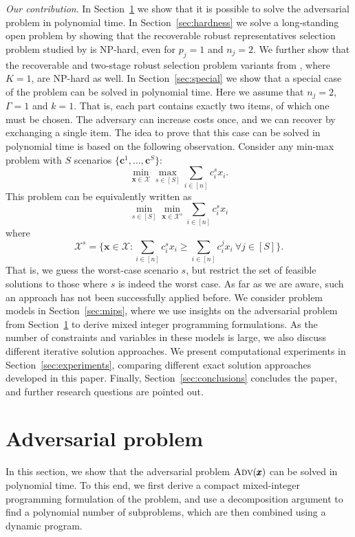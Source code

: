 \documentclass[a4paper,11pt,abstracton]{scrartcl}
\theoremstyle{definition}
\theoremstyle{remark}
\newcommand{\X}{\mathcal{X}}
\begin{document}
\emph{Our contribution}. In Section~\ref{sec:adv} we show that it is possible to solve the adversarial problem in polynomial time. In Section~\ref{sec:hardness} we solve a long-standing open problem by showing that the recoverable robust representatives selection problem studied by \cite{busing2011phd} is NP-hard, even for $p_j=1$ and $n_j=2$. We further show that the recoverable and two-stage robust selection problem variants from \cite{chassein2018recoverable}, where $K=1$, are NP-hard as well. In Section~\ref{sec:special} we show that a special case of the problem can be solved in polynomial time. Here we assume that $n_j=2$, $\Gamma=1$ and $k=1$. That is, each part contains exactly two items, of which one must be chosen. The adversary can increase costs once, and we can recover by exchanging a single item. The idea to prove that this case can be solved in polynomial time is based on the following observation. Consider any min-max problem with $S$ scenarios $\{\pmb{c}^1,\ldots,\pmb{c}^S\}$:
\[ \min_{\pmb{x}\in\X} \max_{s\in[S]} \sum_{i\in[n]} c^s_i x_i.\]
This problem can be equivalently written as
\[ \min_{s\in[S]} \min_{\pmb{x}\in\X^s} \sum_{i\in[n]} c^s_i x_i \]
where
\[ \X^s = \{ \pmb{x}\in\X : \sum_{i\in[n]} c^s_i x_i \ge \sum_{i\in[n]} c^{j}_i x_i\ \forall j\in[S] \}. \]
That is, we guess the worst-case scenario $s$, but restrict the set of feasible solutions to those where $s$ is indeed the worst case. As far as we are aware, such an approach has not been successfully applied before. 
We consider problem models in Section~\ref{sec:mips}, where we use insights on the adversarial problem from Section~\ref{sec:adv} to derive mixed integer programming formulations. As the number of constraints and variables in these models is large, we also discuss different iterative solution approaches. 
We present computational experiments in Section~\ref{sec:experiments}, comparing different exact solution approaches developed in this paper. Finally, Section~\ref{sec:conclusions} concludes the paper, and further research questions are pointed out.



\section{Adversarial problem}
\label{sec:adv}

In this section, we show that the adversarial problem $\textsc{Adv}(\pmb{x})$ can be solved in polynomial time. To this end, we first derive a compact mixed-integer programming formulation of the problem, and use a decomposition argument to find a polynomial number of subproblems, which are then combined using a dynamic program.
\end{document}
